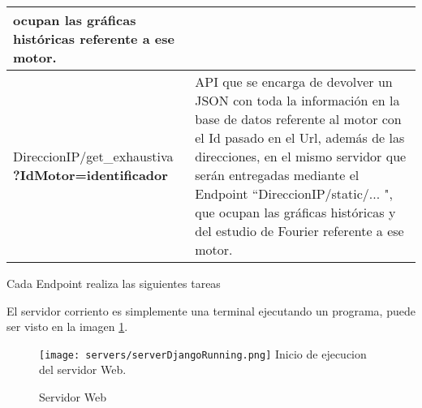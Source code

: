 \begin{table}[ht]
\begin{center}
\begin{tabular}{|p{5cm}|p{10cm}|}
                ocupan las gráficas históricas referente a ese motor.
                \\\hline
                DireccionIP/get\_exhaustiva \textbf{?IdMotor=identificador}&
                API que se encarga de devolver un JSON con toda la información
                en la base de datos referente al motor con el Id pasado en el
                Url, además de las direcciones, en el mismo servidor que serán
                entregadas mediante el Endpoint ``DireccionIP/static/... ", que
                ocupan las gráficas históricas y del estudio de Fourier
                referente a ese motor.
                \\\hline
            \end{tabular}

        \end{center}

    \end{table}

    Cada Endpoint realiza las siguientes tareas

    El servidor corriento es simplemente una terminal ejecutando un programa,
    puede ser visto en la imagen \ref{img:serverWebRunning}.

	\begin{figure}[htb]
		\centering
        \caption{Servidor Web}
        \texttt{[image: servers/serverDjangoRunning.png]}
        Inicio de ejecucion del servidor Web.    \label{img:serverWebRunning}
	\end{figure}


